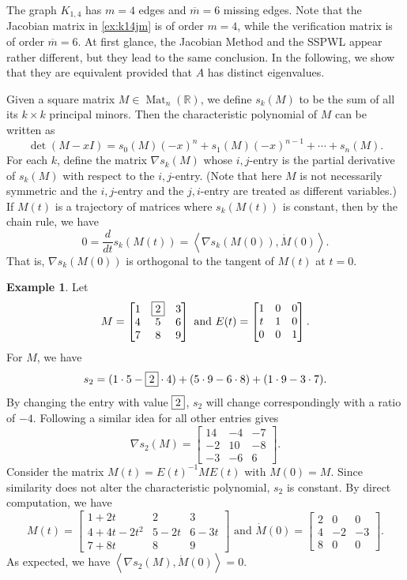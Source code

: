 \documentclass{article}
\theoremstyle{definition}
\newtheorem{example}[theorem]{Example}
\newcommand{\inp}[2]{\left\langle#1,#2\right\rangle}
\newcommand{\mat}[1][n]{\operatorname{Mat}_{#1}(\mathbb{R})}
\begin{document}
The graph $K_{1,4}$ has $m = 4$ edges and $\overline{m} = 6$ missing edges.  Note that the Jacobian matrix in \cref{ex:k14jm} is of order $m = 4$, while the verification matrix is of order $\overline{m} = 6$.  At first glance, the Jacobian Method and the SSPWL appear rather different, but they lead to  the same conclusion.  In the following, we show that they are equivalent provided that $A$ has distinct eigenvalues.

Given a square matrix $M\in\mat$, we define $s_k(M)$ to be the sum of all its $k\times k$ principal minors.  Then the  characteristic polynomial of $M$ can be written as  
\[
    \det(M - xI) = s_0(M)(-x)^n + s_1(M)(-x)^{n-1} + \cdots + s_n(M).
\]
For each $k$, define the matrix $\nabla s_k(M)$ whose $i,j$-entry is the partial derivative of $s_k(M)$ with respect to the $i,j$-entry.  (Note that here $M$ is not necessarily symmetric and the $i,j$-entry and the $j,i$-entry are treated as different variables.)  If $M(t)$ is a trajectory of matrices where $s_k(M(t))$ is constant, then by the chain rule, we have 
\[
    0 = \frac{d}{dt}s_k(M(t)) = \inp{\nabla s_k(M(0))}{\dot{M}(0)}.
\]
That is, $\nabla s_k(M(0))$ is orthogonal to the tangent of $M(t)$ at $t = 0$. 

\begin{example}
\label{ex:nsymortho}
Let 
\[
    M = \begin{bmatrix}
        1 & \fbox{2} & 3 \\
        4 & 5 & 6 \\
        7 & 8 & 9
    \end{bmatrix}
    \text{ and }
    E(t) = \begin{bmatrix}
        1 & 0 & 0 \\
        t & 1 & 0 \\
        0 & 0 & 1
    \end{bmatrix}.
\]
For $M$, we have 
\[
    s_2 = (1\cdot 5 - \fbox{2}\cdot 4 ) +  (5\cdot 9 - 6\cdot 8)  +  (1\cdot 9 - 3\cdot 7).
\]
By changing the entry with value $\fbox{2}$, $s_2$ will change correspondingly with a ratio of $-4$.  Following a similar idea for all other entries gives
\[
    \nabla s_2(M) = \begin{bmatrix}
        14 & -4 & -7 \\
        -2 & 10 & -8 \\
        -3 & -6 & 6
    \end{bmatrix}.
\]
Consider the matrix $M(t) = E(t)^{-1} ME(t)$ with $M(0) = M$.  Since similarity does not alter the characteristic polynomial, $s_2$ is constant.  By direct computation, we have 
\[
    M(t) = \begin{bmatrix}
        1+2t & 2 & 3 \\
        4+4t-2t^2 & 5-2t & 6-3t \\
        7+8t & 8 & 9
    \end{bmatrix}
    \text{ and }
    \dot{M}(0) = \begin{bmatrix}
        2 & 0 & 0 \\
        4 & -2 & -3 \\
        8 & 0 & 0
    \end{bmatrix}.
\]
As expected, we have $\inp{\nabla s_2(M)}{\dot{M}(0)} = 0$.
\end{example}
\end{document}

